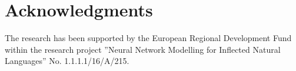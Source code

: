 \documentclass[runningheads,a4paper]{lncs/llncs}
\begin{document}
\section{Acknowledgments}
\label{sec:acknowledgments}

The research has been supported by the European Regional  Development  Fund  within  the  research project ”Neural Network Modelling for Inflected Natural Languages” No. 1.1.1.1/16/A/215.

\FloatBarrier





\end{document}

